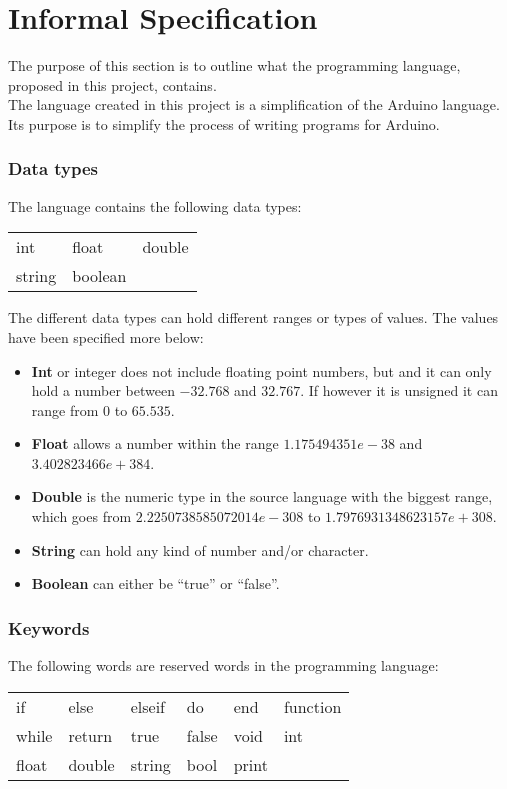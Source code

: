 \chapter{Informal Specification}\label{analysis:informal-specification}
The purpose of this section is to outline what the programming language, proposed in this project, contains.
\\The language created in this project is a simplification of the Arduino language. Its purpose is to simplify the process of writing programs for Arduino.   

\subsection{Data types}
The language contains the following data types: \\ 
\begin{center}
\begin{tabular}{ l l l }
int & float & double \\
string & boolean \\
\end{tabular}
\end{center}
The different data types can hold different ranges or types of values. The values have been specified more below: 
\begin{itemize}
\item \textbf{Int} or integer does not include floating point numbers, but and it can only hold a number between $-32.768$ and $32.767$. If however it is unsigned it can range from $0$ to $65.535$.
\item \textbf{Float} allows a number within the range $1.175494351e-38$ and $3.402823466e+384$.
\item \textbf{Double} is the numeric type in the source language with the biggest range, which goes from $2.2250738585072014e-308$ to $1.7976931348623157e+308$.
\item \textbf{String} can hold any kind of number and/or character. 
\item \textbf{Boolean} can either be ``true'' or ``false''. 
\end{itemize}

\subsection{Keywords}
The following words are reserved words in the programming language:\\ 
\begin{center}
\begin{tabular}{ l l l l l l}
if & else & elseif & do & end & function \\
while & return & true & false & void & int \\
float & double & string & bool & print\\
\end{tabular}
\end{center}

